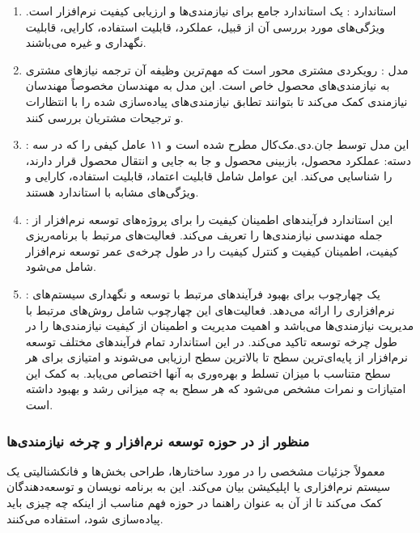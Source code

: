 \begin{enumerate}
    \item استاندارد : یک استاندارد جامع برای
    نیازمندی‌ها و ارزیابی کیفیت نرم‌افزار است. ویژگی‌های مورد بررسی آن از قبیل،
    عملکرد، قابلیت استفاده، کارایی، قابلیت نگهداری و غیره می‌باشند.
    \item مدل : رویکردی مشتری محور است که
    مهم‌ترین وظیفه آن ترجمه نیاز‌های مشتری به نیازمندی‌های محصول خاص است. این
    مدل به مهندسان مخصوصاً مهندسان نیازمندی کمک می‌کند تا بتوانند تطابق
    نیازمندی‌های پیاده‌سازی شده را با انتظارات و ترجیحات مشتریان بررسی کنند.
    \item {}: این مدل توسط جان.دی.مک‌کال مطرح شده است و
    ۱۱ عامل کیفی را که در سه دسته: عملکرد محصول، بازبینی محصول و جا به جایی و
    انتقال محصول قرار دارند، را شناسایی می‌کند. این عوامل شامل قابلیت اعتماد،
    قابلیت استفاده، کارایی و ویژگی‌های مشابه با استاندارد  هستند.
    \item {}: این استاندارد فرآیند‌های اطمینان کیفیت را برای
    پروژه‌های توسعه نرم‌افزار از جمله مهندسی نیازمندی‌ها را تعریف می‌کند.
    فعالیت‌های مرتبط با برنامه‌ریزی کیفیت، اطمینان کیفیت و کنترل کیفیت را در طول
    چرخه‌ی عمر توسعه نرم‌افزار شامل می‌شود.
    \item {}: یک چهارچوب برای
    بهبود فرآیند‌های مرتبط با توسعه و نگهداری سیستم‌های نرم‌افزاری را ارائه
    می‌دهد. فعالیت‌های این چهارچوب شامل روش‌های مرتبط با مدیریت نیازمندی‌ها
    می‌باشد و اهمیت مدیریت و اطمینان از کیفیت نیازمندی‌ها را در طول چرخه توسعه
    تاکید می‌کند. در این استاندارد تمام فرآیند‌های مختلف توسعه نرم‌افزار از
    پایه‌ای‌ترین سطح تا بالاترین سطح ارزیابی می‌شوند و امتیازی برای هر سطح
    متناسب با میزان تسلط و بهره‌وری به آنها اختصاص می‌یابد. به کمک این امتیازات
    و نمرات مشخص می‌شود که هر سطح به چه میزانی رشد و بهبود داشته است.
\end{enumerate}

\subsubsection*{منظور از  در حوزه توسعه نرم‌افزار و چرخه
نیازمندی‌ها}

معمولاً جزئیات مشخصی را در مورد ساختار‌ها، طراحی بخش‌ها و فانکشنالیتی یک سیستم
نرم‌افزاری یا اپلیکیشن بیان می‌کند. این  به برنامه نویسان و
توسعه‌دهندگان کمک می‌کند تا از آن به عنوان راهنما در حوزه فهم مناسب از اینکه چه
چیزی باید پیاده‌سازی شود، استفاده می‌کنند.

